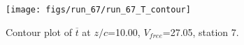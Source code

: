 \begin{figure}[H]
\centering
\texttt{[image: figs/run\_67/run\_67\_T\_contour]}
\caption{Contour plot of $\overline{t}$ at $z/c$=10.00, $V_{free}$=27.05, station 7.}
\end{figure}


